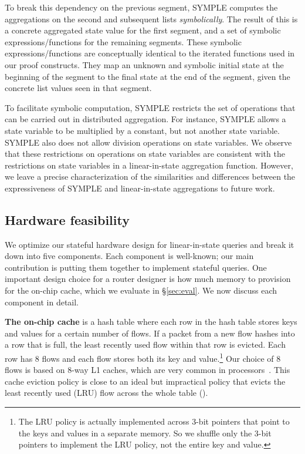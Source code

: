 To break this dependency on the previous segment, SYMPLE computes the
aggregations on the second and subsequent lists {\em symbolically}.  The result
of this is a concrete aggregated state value for the first segment, and a set
of symbolic expressions/functions for the remaining segments.  These symbolic
expressions/functions are conceptually identical to the iterated functions used
in our proof constructs.  They map an unknown and symbolic initial state at the
beginning of the segment to the final state at the end of the segment, given
the concrete list values seen in that segment.

To facilitate symbolic computation, SYMPLE restricts the set of operations that
can be carried out in distributed aggregation. For instance, SYMPLE allows a
state variable to be multiplied by a constant, but not another state variable.
SYMPLE also does not allow division operations on state variables. We observe
that these restrictions on operations on state variables are consistent with
the restrictions on state variables in a linear-in-state aggregation function.
However, we leave a precise characterization of the similarities and
differences between the expressiveness of SYMPLE and linear-in-state
aggregations to future work.

\subsection{Hardware feasibility}
\label{sec:hardware-feasibility}
We optimize our stateful hardware design for linear-in-state queries and break
it down into five components.  Each component is well-known; our main
contribution is putting them together to implement stateful queries.  One
important design choice for a router designer is how much memory to provision
for the on-chip cache, which we evaluate in \S\ref{sec:eval}.  We now discuss
each component in detail.

\textbf{The on-chip cache} is a hash table where each row in the hash table
stores keys and values for a certain number of flows. If a packet from a new
flow hashes into a row that is full, the least recently used flow within that
row is evicted. Each row has 8 flows and each flow stores both its key and
value.\footnote{The LRU policy is actually implemented across 3-bit pointers
that point to the keys and values in a separate memory. So we shuffle only the
3-bit pointers to implement the LRU policy, not the entire key and value.} Our
choice of 8 flows is based on 8-way L1 caches, which are very common in
processors~\cite{intel_opt_manual}. This cache eviction policy is close to an
ideal but impractical policy that evicts the least recently used (LRU) flow
across the whole table ().

